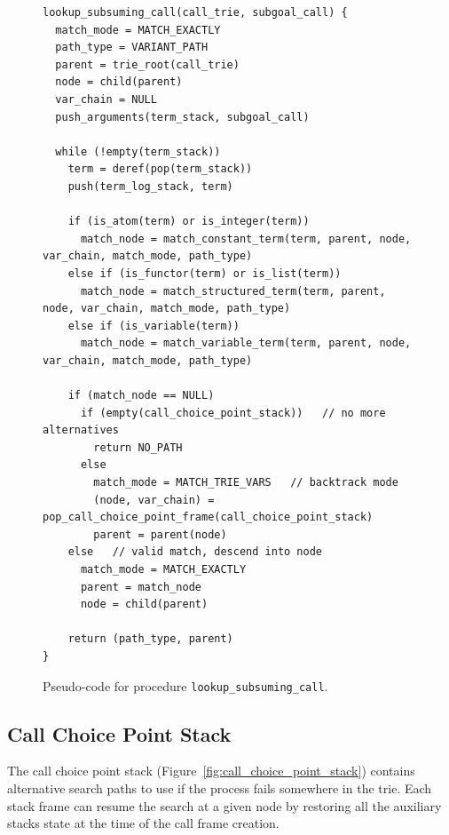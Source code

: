 \begin{figure}[ht]
\begin{Verbatim}
lookup_subsuming_call(call_trie, subgoal_call) {
  match_mode = MATCH_EXACTLY
  path_type = VARIANT_PATH
  parent = trie_root(call_trie)
  node = child(parent)
  var_chain = NULL
  push_arguments(term_stack, subgoal_call)

  while (!empty(term_stack))
    term = deref(pop(term_stack))
    push(term_log_stack, term)
  
    if (is_atom(term) or is_integer(term))
      match_node = match_constant_term(term, parent, node, var_chain, match_mode, path_type)
    else if (is_functor(term) or is_list(term))
      match_node = match_structured_term(term, parent, node, var_chain, match_mode, path_type)
    else if (is_variable(term))
      match_node = match_variable_term(term, parent, node, var_chain, match_mode, path_type)
  
    if (match_node == NULL)
      if (empty(call_choice_point_stack))   // no more alternatives
        return NO_PATH
      else
        match_mode = MATCH_TRIE_VARS   // backtrack mode
        (node, var_chain) = pop_call_choice_point_frame(call_choice_point_stack)
        parent = parent(node)
    else   // valid match, descend into node
      match_mode = MATCH_EXACTLY
      parent = match_node
      node = child(parent)
      
    return (path_type, parent)
}
\end{Verbatim}
\caption{Pseudo-code for procedure \texttt{lookup\_subsuming\_call}.}
\label{fig:lookup_subsuming_call}
\end{figure}

\subsection{Call Choice Point Stack}

The call choice point stack (Figure~\ref{fig:call_choice_point_stack}) contains alternative
search paths to use if the process fails somewhere in the trie.
Each stack frame can resume the search at a given node by restoring all the auxiliary stacks state at the time
of the call frame creation.

